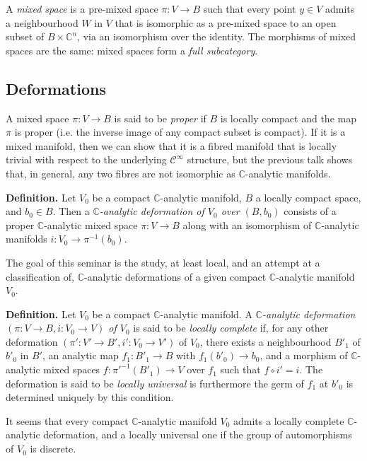 \documentclass{article}
\newenvironment{rmenv}[1]
  {\par\medskip\noindent\textbf{#1.}\rmfamily}
  {\medskip}
\newcommand{\CC}{\mathbb{C}}
\newcommand{\oldpage}[1]{\marginpar{\footnotesize$\Big\vert$ \textit{p.~#1}}}
\begin{document}
A \emph{mixed space} is a pre-mixed space $\pi\colon V\to B$ such that every point $y\in V$ admits a neighbourhood $W$ in $V$ that is isomorphic as a pre-mixed space to an open subset of $B\times\CC^n$, via an isomorphism over the identity.
The morphisms of mixed spaces are the same: mixed spaces form a \emph{full subcategory}.


\subsection{Deformations}
\label{II.3}

A mixed space $\pi\colon V\to B$ is said to be \emph{proper} if $B$ is locally compact and the map $\pi$ is proper (i.e. the inverse image of any compact subset is compact).
If it is a mixed manifold, then we can show that it is a fibred manifold that is locally trivial with respect to the underlying $\mathscr{C}^\infty$ structure, but the previous talk shows that, in general, any two fibres are not isomorphic as $\CC$-analytic manifolds.

\begin{rmenv}{Definition}
  Let $V_0$ be a compact $\CC$-analytic manifold, $B$ a locally compact space, and $b_0\in B$.
  Then a \emph{$\CC$-analytic deformation of $V_0$ over $(B,b_0)$} consists of a proper $\CC$-analytic mixed space $\pi\colon V\to B$
\oldpage{2-04}
  along with an isomorphism of $\CC$-analytic manifolds $i\colon V_0\to\pi^{-1}(b_0)$.
\end{rmenv}

The goal of this seminar is the study, at least local, and an attempt at a classification of, $\CC$-analytic deformations of a given compact $\CC$-analytic manifold $V_0$.

\begin{rmenv}{Definition}
  Let $V_0$ be a compact $\CC$-analytic manifold.
  A \emph{$\CC$-analytic deformation $(\pi\colon V\to B,i\colon V_0\to V)$ of $V_0$} is said to be \emph{locally complete} if, for any other deformation $(\pi'\colon V'\to B',i'\colon V_0\to V')$ of $V_0$, there exists a neighbourhood $B'_1$ of $b'_0$ in $B'$, an analytic map $f_1\colon B'_1\to B$ with $f_1(b'_0)\to b_0$, and a morphism of $\CC$-analytic mixed spaces $f\colon {\pi'}^{-1}(B'_1)\to V$ over $f_1$ such that $f\circ i'=i$.
  The deformation is said to be \emph{locally universal} is furthermore the germ of $f_1$ at $b'_0$ is determined uniquely by this condition.
\end{rmenv}

It seems that every compact $\CC$-analytic manifold $V_0$ admits a locally complete $\CC$-analytic deformation, and a locally universal one if the group of automorphisms of $V_0$ is discrete.
\end{document}
